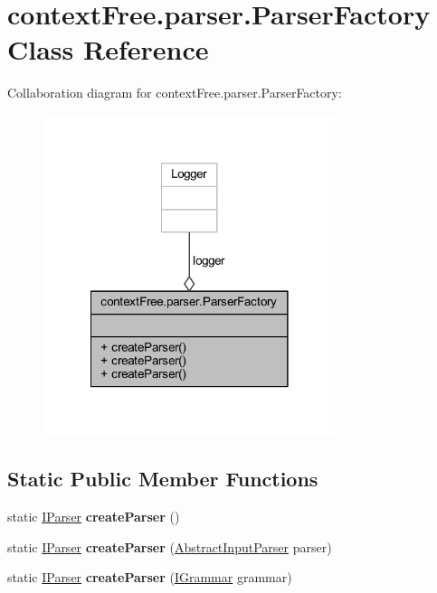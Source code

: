 \hypertarget{classcontext_free_1_1parser_1_1_parser_factory}{\section{context\-Free.\-parser.\-Parser\-Factory Class Reference}
\label{classcontext_free_1_1parser_1_1_parser_factory}
}


Collaboration diagram for context\-Free.\-parser.\-Parser\-Factory\-:\nopagebreak
\begin{figure}[H]
\begin{center}
\leavevmode
\includegraphics[width=242pt]{classcontext_free_1_1parser_1_1_parser_factory__coll__graph}
\end{center}
\end{figure}
\subsection*{Static Public Member Functions}
\begin{DoxyCompactItemize}
\item 
\hypertarget{classcontext_free_1_1parser_1_1_parser_factory_ace675bb41d96bc1933cafbb04e34a928}{static \hyperlink{interfacecontext_free_1_1parser_1_1_i_parser}{I\-Parser} {\bfseries create\-Parser} ()}\label{classcontext_free_1_1parser_1_1_parser_factory_ace675bb41d96bc1933cafbb04e34a928}

\item 
\hypertarget{classcontext_free_1_1parser_1_1_parser_factory_a18495bcc1663076b276180a3c695e5de}{static \hyperlink{interfacecontext_free_1_1parser_1_1_i_parser}{I\-Parser} {\bfseries create\-Parser} (\hyperlink{classinput_parser_1_1_abstract_input_parser}{Abstract\-Input\-Parser} parser)}\label{classcontext_free_1_1parser_1_1_parser_factory_a18495bcc1663076b276180a3c695e5de}

\item 
\hypertarget{classcontext_free_1_1parser_1_1_parser_factory_aa1cf87208ec422991a7bd454358b8161}{static \hyperlink{interfacecontext_free_1_1parser_1_1_i_parser}{I\-Parser} {\bfseries create\-Parser} (\hyperlink{interfacecontext_free_1_1grammar_1_1_i_grammar}{I\-Grammar} grammar)}\label{classcontext_free_1_1parser_1_1_parser_factory_aa1cf87208ec422991a7bd454358b8161}

\end{DoxyCompactItemize}
